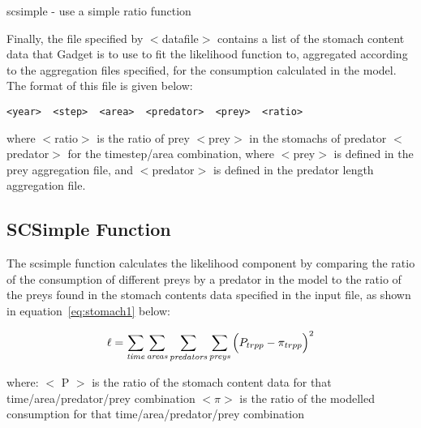 \documentclass[10pt,twoside]{book}
\begin{document}
\bigskip
scsimple - use a simple ratio function

\bigskip
Finally, the file specified by $<$datafile$>$ contains a list of the stomach content data that Gadget is to use to fit the likelihood function to, aggregated according to the aggregation files specified, for the consumption calculated in the model.  The format of this file is given below:

{\small\begin{verbatim}
<year>  <step>  <area>  <predator>  <prey>  <ratio>
\end{verbatim}}

where $<$ratio$>$ is the ratio of prey $<$prey$>$ in the stomachs of predator $<$predator$>$ for the timestep/area combination, where $<$prey$>$ is defined in the prey aggregation file, and $<$predator$>$ is defined in the predator length aggregation file.

\subsection{SCSimple Function}
The scsimple function calculates the likelihood component by comparing the ratio of the consumption of different preys by a predator in the model to the ratio of the preys found in the stomach contents data specified in the input file, as shown in equation~\ref{eq:stomach1} below:

\begin{equation}\label{eq:stomach1}
\ell = \sum_{\it time}\sum_{\it areas}\sum_{\it predators}\sum_{\it preys} \Big( P_{trpp} - \pi_{trpp} \Big) ^2
\end{equation}

where:\newline
$<$ P $>$ is the ratio of the stomach content data for that time/area/predator/prey combination\newline
$<\pi>$ is the ratio of the modelled consumption for that time/area/predator/prey combination


\end{document}
